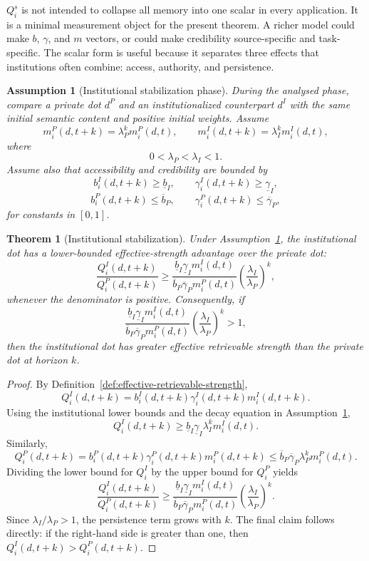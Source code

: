 \documentclass[11pt]{article}
\newtheorem{assumption}{Assumption}
\newtheorem{theorem}{Theorem}
\theoremstyle{remark}
\begin{document}
$Q_i^s$ is not intended to collapse all memory into one scalar in every
application. It is a minimal measurement object for the present theorem.
A richer model could make $b$, $\gamma$, and $m$ vectors, or could make
credibility source-specific and task-specific. The scalar form is useful
because it separates three effects that institutions often combine:
access, authority, and persistence.

\begin{assumption}[Institutional stabilization phase]\label{ass:institutional-stabilization-phase}
During the analysed phase, compare a private dot $d^P$ and an
institutionalized counterpart $d^I$ with the same initial semantic
content and positive initial weights. Assume
$$
m_i^P(d,t+k)=\lambda_P^k m_i^P(d,t), \qquad
m_i^I(d,t+k)=\lambda_I^k m_i^I(d,t),
$$
where
$$
0<\lambda_P<\lambda_I<1.
$$
Assume also that accessibility and credibility are bounded by
$$
b_i^I(d,t+k)\geq \underline b_I,
\qquad
\gamma_i^I(d,t+k)\geq \underline\gamma_I,
$$
$$
b_i^P(d,t+k)\leq \overline b_P,
\qquad
\gamma_i^P(d,t+k)\leq \overline\gamma_P,
$$
for constants in $[0,1]$.
\end{assumption}

\begin{theorem}[Institutional stabilization]\label{thm:institutional-stabilization}
Under Assumption~\ref{ass:institutional-stabilization-phase}, the
institutional dot has a lower-bounded effective-strength advantage over
the private dot:
$$
\frac{Q_i^I(d,t+k)}{Q_i^P(d,t+k)}
\geq
\frac{\underline b_I\underline\gamma_I m_i^I(d,t)}
     {\overline b_P\overline\gamma_P m_i^P(d,t)}
\left(\frac{\lambda_I}{\lambda_P}\right)^k,
$$
whenever the denominator is positive. Consequently, if
$$
\frac{\underline b_I\underline\gamma_I m_i^I(d,t)}
     {\overline b_P\overline\gamma_P m_i^P(d,t)}
\left(\frac{\lambda_I}{\lambda_P}\right)^k>1,
$$
then the institutional dot has greater effective retrievable strength
than the private dot at horizon $k$.
\end{theorem}

\begin{proof}
By Definition~\ref{def:effective-retrievable-strength},
$$
Q_i^I(d,t+k)=b_i^I(d,t+k)\gamma_i^I(d,t+k)m_i^I(d,t+k).
$$
Using the institutional lower bounds and the decay equation in
Assumption~\ref{ass:institutional-stabilization-phase},
$$
Q_i^I(d,t+k)
\geq
\underline b_I\underline\gamma_I\lambda_I^k m_i^I(d,t).
$$
Similarly,
$$
Q_i^P(d,t+k)=b_i^P(d,t+k)\gamma_i^P(d,t+k)m_i^P(d,t+k)
\leq
\overline b_P\overline\gamma_P\lambda_P^k m_i^P(d,t).
$$
Dividing the lower bound for $Q_i^I$ by the upper bound for $Q_i^P$
yields
$$
\frac{Q_i^I(d,t+k)}{Q_i^P(d,t+k)}
\geq
\frac{\underline b_I\underline\gamma_I m_i^I(d,t)}
     {\overline b_P\overline\gamma_P m_i^P(d,t)}
\left(\frac{\lambda_I}{\lambda_P}\right)^k.
$$
Since $\lambda_I/\lambda_P>1$, the persistence term grows with $k$.
The final claim follows directly: if the right-hand side is greater than
one, then $Q_i^I(d,t+k)>Q_i^P(d,t+k)$.
\end{proof}
\end{document}
